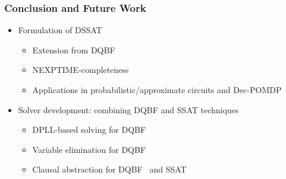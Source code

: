 \begin{frame}
      \frametitle{Conclusion and Future Work}
      \begin{itemize}
            \item Formulation of DSSAT
                  \pause
                  \begin{itemize}
                        \item Extension from DQBF
                              \pause
                        \item NEXPTIME-completeness
                              \pause
                        \item Applications in probabilistic/approximate circuits and Dec-POMDP
                              \pause
                  \end{itemize}
            \item Solver development: combining DQBF and SSAT techniques
                  \pause
                  \begin{itemize}
                        \item DPLL-based solving for DQBF~\cite{Frohlich2012}
                              \pause
                        \item Variable elimination for DQBF~\cite{Gitina2015}
                              \pause
                        \item Clausal abstraction for DQBF~\cite{Tentrup2019} and SSAT~\cite{Chen2021}
                  \end{itemize}
      \end{itemize}
\end{frame}